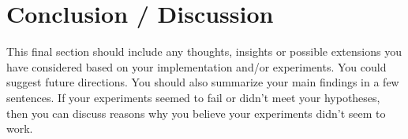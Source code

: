 \documentclass{article}
\begin{document}
\section{Conclusion / Discussion}
This final section should include any thoughts, insights or possible extensions you have considered based on your implementation and/or experiments.  You could suggest future directions.  You should also summarize your main findings in a few sentences.  If your experiments seemed to fail or didn't meet your hypotheses, then you can discuss reasons why you believe your experiments didn't seem to work. \citep{luo2016efficient} \citep{yao2018mvsnet} \citep{yu2017single} \citep{duggal2019deeppruner} \citep{barnes2009patchmatch}



\end{document}
